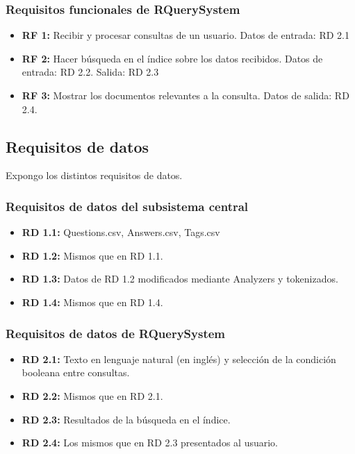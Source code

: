 \subsubsection{Requisitos funcionales de RQuerySystem}

\begin{itemize}
	\item \textbf{RF 1:} Recibir y procesar consultas de un usuario. Datos de entrada: RD 2.1
	\item \textbf{RF 2:} Hacer búsqueda en el índice sobre los datos recibidos. Datos de entrada: RD 2.2. Salida: RD 2.3
	\item \textbf{RF 3:} Mostrar los documentos relevantes a la consulta. Datos de salida: RD 2.4.
\end{itemize}

\subsection{Requisitos de datos}

Expongo los distintos requisitos de datos.

\subsubsection{Requisitos de datos del subsistema central}

\begin{itemize}
	\item \textbf{RD 1.1:} Questions.csv, Answers.csv, Tags.csv
	\item \textbf{RD 1.2:} Mismos que en RD 1.1.
	\item \textbf{RD 1.3:} Datos de RD 1.2 modificados mediante Analyzers y tokenizados.
	\item \textbf{RD 1.4:} Mismos que en RD 1.4.
\end{itemize}

\subsubsection{Requisitos de datos de RQuerySystem}

\begin{itemize}
	\item \textbf{RD 2.1:} Texto en lenguaje natural (en inglés) y selección de la condición booleana entre consultas.
	\item \textbf{RD 2.2:} Mismos que en RD 2.1.
	\item \textbf{RD 2.3:} Resultados de la búsqueda en el índice.
	\item \textbf{RD 2.4:} Los mismos que en RD 2.3 presentados al usuario.
\end{itemize}

